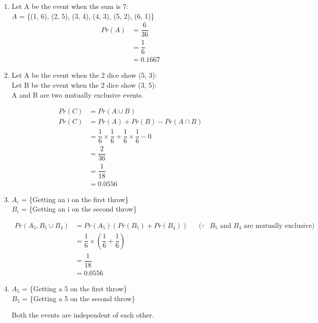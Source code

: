 \documentclass{article}
\begin{document}
\begin{enumerate}
\begin{enumerate}
			\item 
			Let A be the event when the sum is 7:\\
			$A$ = \{(1, 6), (2, 5), (3, 4), (4, 3), (5, 2), (6, 1)\}\\
			\begin{align*}
			Pr(A) &= \dfrac{6}{36} \\
				  &= \dfrac{1}{6}\\
				  &= \mathbf{0.1667}
			\end{align*}
			
			\item Let A be the event when the 2 dice show (5, 3):\\
			Let B be the event when the 2 dice show (3, 5):\\
			
			A and B are two mutually exclusive events.
			
			\begin{align*}
			Pr(C) &= Pr(A \cup B)\\
			Pr(C) &= Pr(A) + Pr(B) - Pr(A \cap B) \\
				  &= \dfrac{1}{6} \times \dfrac{1}{6} + \dfrac{1}{6} \times \dfrac{1}{6} - 0\\
				  &= \dfrac{2}{36}\\
				  &= \dfrac{1}{18}\\
				  &= \mathbf{0.0556}
			\end{align*}
			
			\newpage
			\item
			$A_{i}$ = \{Getting an i on the first throw\}\\
			$B_{i}$ = \{Getting an i on the second throw\}
			
			\begin{align*}
				Pr(A_{5}, B_{5} \cup B_{4}) &= Pr(A_{5}) (Pr(B_{5}) + Pr(B_{4})) && \text{($\because$ $B_{5}$ and $B_{4}$ are mutually exclusive)}\\
											&= \dfrac{1}{6} \times (\dfrac{1}{6} + \dfrac{1}{6})\\
											&= \dfrac{1}{18}\\
											&= \mathbf{0.0556}
			\end{align*}
			
			\item
			$A_{5}$ = \{Getting a 5 on the first throw\}\\
			$B_{5}$ = \{Getting a 5 on the second throw\}
			
			Both the events are independent of each other.
			

\end{enumerate}
\end{enumerate}
\end{document}
